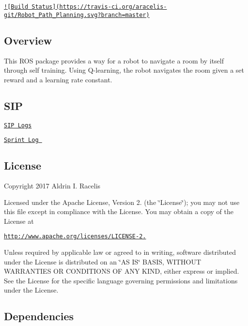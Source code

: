 \href{https://travis-ci.org/aracelis-git/Robot_Path_Planning}{\tt !\mbox{[}Build Status\mbox{]}(https\-://travis-\/ci.\-org/aracelis-\/git/\-Robot\-\_\-\-Path\-\_\-\-Planning.\-svg?branch=master)} 



\subsection*{Overview}

This R\-O\-S package provides a way for a robot to navigate a room by itself through self training. Using Q-\/learning, the robot navigates the room given a set reward and a learning rate constant.

\subsection*{S\-I\-P}

\href{https://drive.google.com/open?id=1vPMsvtIHx467KGZdfskSs1heT60qLzy87K0tlMnckY4}{\tt S\-I\-P Logs}

\href{https://drive.google.com/open?id=1AiFwYDx-4b8577_lUeq3aE7R47sUl6ZOjDB4g3GRvhU }{\tt Sprint Log }

\subsection*{License}

Copyright 2017 Aldrin I. Racelis

Licensed under the Apache License, Version 2. (the \char`\"{}\-License\char`\"{}); you may not use this file except in compliance with the License. You may obtain a copy of the License at

\href{http://www.apache.org/licenses/LICENSE-2.0}{\tt http\-://www.\-apache.\-org/licenses/\-L\-I\-C\-E\-N\-S\-E-\/2.}

Unless required by applicable law or agreed to in writing, software distributed under the License is distributed on an \char`\"{}\-A\-S I\-S\char`\"{} B\-A\-S\-I\-S, W\-I\-T\-H\-O\-U\-T W\-A\-R\-R\-A\-N\-T\-I\-E\-S O\-R C\-O\-N\-D\-I\-T\-I\-O\-N\-S O\-F A\-N\-Y K\-I\-N\-D, either express or implied. See the License for the specific language governing permissions and limitations under the License.

\subsection*{Dependencies}

